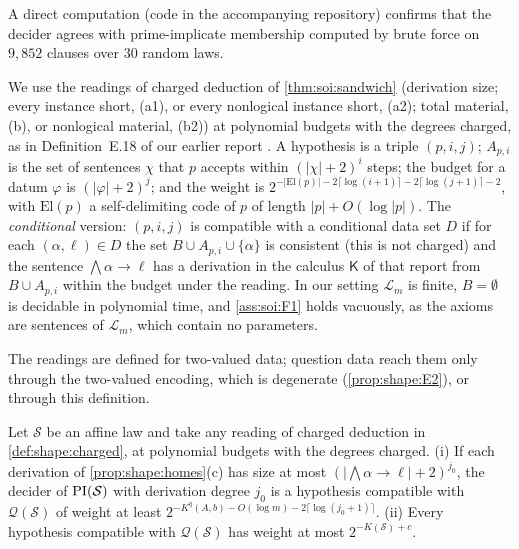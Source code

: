 A direct computation (code in the accompanying repository) confirms that the decider agrees with prime-implicate membership computed by brute force on $9{,}852$ clauses over $30$ random laws.

\begin{definition}\label{def:shape:charged}
We use the readings of charged deduction of \cref{thm:soi:sandwich} (derivation size; every instance short, (a1), or every nonlogical instance short, (a2); total material, (b), or nonlogical material, (b2)) at polynomial budgets with the degrees charged, as in Definition~E.18 of our earlier report \citep{claude2026axiominduction}. A hypothesis is a triple $(p,i,j)$; $A_{p,i}$ is the set of sentences $\chi$ that $p$ accepts within $(\lvert\chi\rvert+2)^i$ steps; the budget for a datum $\varphi$ is $(\lvert\varphi\rvert+2)^j$; and the weight is $2^{-\lvert\mathrm{El}(p)\rvert-2\lceil\log(i+1)\rceil-2\lceil\log(j+1)\rceil-2}$, with $\mathrm{El}(p)$ a self-delimiting code of $p$ of length $\lvert p\rvert+O(\log\lvert p\rvert)$. The \emph{conditional} version: $(p,i,j)$ is compatible with a conditional data set $D$ if for each $(\alpha,\ell)\in D$ the set $B\cup A_{p,i}\cup\{\alpha\}$ is consistent (this is not charged) and the sentence $\bigwedge\alpha\to\ell$ has a derivation in the calculus $\mathsf K$ of that report from $B\cup A_{p,i}$ within the budget under the reading. In our setting $\mathcal L_m$ is finite, $B=\emptyset$ is decidable in polynomial time, and \cref{ass:soi:F1} holds vacuously, as the axioms are sentences of $\mathcal L_m$, which contain no parameters.
\end{definition}

The readings are defined for two-valued data; question data reach them only through the two-valued encoding, which is degenerate (\cref{prop:shape:E2}), or through this definition.

\begin{theorem}\label{thm:shape:knowhow}
Let $\mathcal S$ be an affine law and take any reading of charged deduction in \cref{def:shape:charged}, at polynomial budgets with the degrees charged. (i) If each derivation of \cref{prop:shape:homes}(c) has size at most $(\lvert\bigwedge\alpha\to\ell\rvert+2)^{j_0}$, the decider of $\mathrm{PI}(\mathcal S)$ with derivation degree $j_0$ is a hypothesis compatible with $\mathcal Q(\mathcal S)$ of weight at least $2^{-K^q(A,b)-O(\log m)-2\lceil\log(j_0+1)\rceil}$. (ii) Every hypothesis compatible with $\mathcal Q(\mathcal S)$ has weight at most $2^{-K(\mathcal S)+c}$.
\end{theorem}

